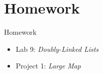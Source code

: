 \documentclass[14pt,aspectratio=1610]{beamer}
\begin{document}
\section*{Homework}

\begin{frame}{Homework}\Large
\begin{itemize}
\item Lab 9: \textit{Doubly-Linked Lists}
\item Project 1: \textit{Large Map}
\end{itemize}
\end{frame}
\end{document}
